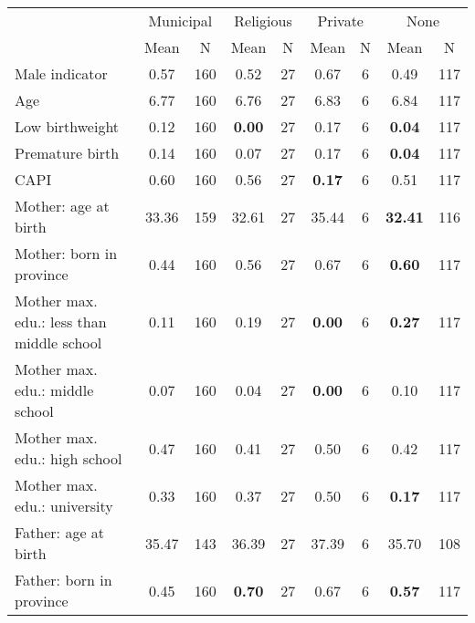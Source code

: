 \begin{tabular}{l c c c c c c c c}
\toprule
& \multicolumn{2}{c}{Municipal} & \multicolumn{2}{c}{Religious} & \multicolumn{2}{c}{Private} & \multicolumn{2}{c}{None} \\
& \scriptsize Mean & \scriptsize N & \scriptsize Mean & \scriptsize N & \scriptsize Mean & \scriptsize N & \scriptsize Mean & \scriptsize N \\
\midrule
Male indicator &      0.57 &       160 &      0.52 &        27 &      0.67 &         6 &      0.49 &       117 \\
Age &      6.77 &       160 &      6.76 &        27 &      6.83 &         6 &      6.84 &       117 \\
Low birthweight &      0.12 &       160 & \textbf{     0.00} &        27 &      0.17 &         6 & \textbf{     0.04} &       117 \\
Premature birth &      0.14 &       160 &      0.07 &        27 &      0.17 &         6 & \textbf{     0.04} &       117 \\
CAPI &      0.60 &       160 &      0.56 &        27 & \textbf{     0.17} &         6 &      0.51 &       117 \\
Mother: age at birth &     33.36 &       159 &     32.61 &        27 &     35.44 &         6 & \textbf{    32.41} &       116 \\
Mother: born in province &      0.44 &       160 &      0.56 &        27 &      0.67 &         6 & \textbf{     0.60} &       117 \\
Mother max. edu.: less than middle school &      0.11 &       160 &      0.19 &        27 & \textbf{     0.00} &         6 & \textbf{     0.27} &       117 \\
Mother max. edu.: middle school &      0.07 &       160 &      0.04 &        27 & \textbf{     0.00} &         6 &      0.10 &       117 \\
Mother max. edu.: high school &      0.47 &       160 &      0.41 &        27 &      0.50 &         6 &      0.42 &       117 \\
Mother max. edu.: university &      0.33 &       160 &      0.37 &        27 &      0.50 &         6 & \textbf{     0.17} &       117 \\
Father: age at birth &     35.47 &       143 &     36.39 &        27 &     37.39 &         6 &     35.70 &       108 \\
Father: born in province &      0.45 &       160 & \textbf{     0.70} &        27 &      0.67 &         6 & \textbf{     0.57} &       117 \\

\end{tabular}
